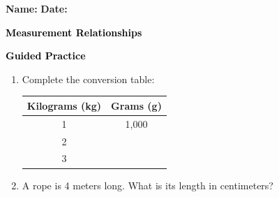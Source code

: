 \documentclass[12pt, letterpaper, fleqn]{article}
\newcommand{\blank}{\underline{\hspace{2.2cm}}}
\begin{document}
\textbf{Name:} \underline{\hspace{5cm}}
\hfill
\textbf{Date:} \underline{\hspace{3cm}}\\

\begin{tcolorbox}[colback=customteal!20]
    \large\textcolor{black}{\textbf{Measurement Relationships}}
\end{tcolorbox}
\newpage
\begin{tcolorbox}[colback=customteal!20]
    \large\textcolor{black}{\textbf{Guided Practice}}
\end{tcolorbox}
\begin{enumerate}[itemsep=3.5cm, leftmargin=0.6cm]
\item Complete the conversion table:
\\
\begin{tabular}{|c|c|}
\hline
\textbf{Kilograms (kg)} & \textbf{Grams (g)} \\ \hline
1 & 1,000 \\ \hline
2 & \blank \\ \hline
3 & \blank \\ \hline
\end{tabular}
\vspace{2cm}
\item A rope is 4 meters long. What is its length in centimeters?
\end{enumerate}
\end{document}
